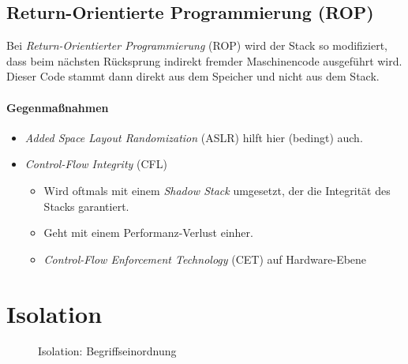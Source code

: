         \subsection{Return-Orientierte Programmierung (ROP)}
            Bei \textit{Return-Orientierter Programmierung} (ROP) wird der Stack so modifiziert, dass beim nächsten Rücksprung indirekt fremder Maschinencode ausgeführt wird. Dieser Code stammt dann direkt aus dem Speicher und nicht aus dem Stack.
            
            \paragraph{Gegenmaßnahmen}
                \begin{itemize}
                	\item \textit{Added Space Layout Randomization} (ASLR) hilft hier (bedingt) auch.
                	\item \textit{Control-Flow Integrity} (CFL)
	                	\begin{itemize}
	                		\item Wird oftmals mit einem \textit{Shadow Stack} umgesetzt, der die Integrität des Stacks garantiert.
	                		\item Geht mit einem Performanz-Verlust einher.
	                		\item \textit{Control-Flow Enforcement Technology} (CET) auf Hardware-Ebene
	                	\end{itemize}
                \end{itemize}

    \section{Isolation}
        \begin{figure}[H]
        	\centering
        	\caption{Isolation: Begriffseinordnung}
        \end{figure}

